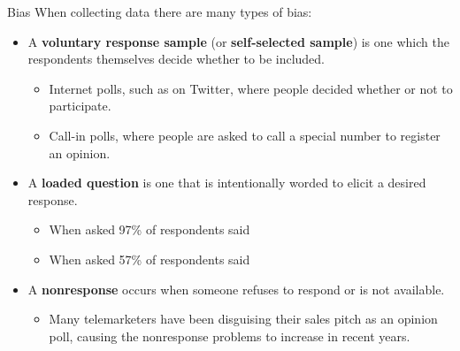 \documentclass{beamer}
\begin{document}
\begin{frame}
\begin{block}{Bias}
When collecting data there are many types of bias:
\begin{itemize}
\item A \textbf{voluntary response sample} (or \textbf{self-selected sample}) is one which the respondents themselves decide whether to be included.\pause
\begin{itemize}
\item Internet polls, such as on Twitter, where people decided whether or not to participate.
\item Call-in polls, where people are asked to call a special number to register an opinion.
\end{itemize}\pause
\item A \textbf{loaded question} is one that is intentionally worded to elicit a desired response.\pause
\begin{itemize}
\item When asked  97\% of respondents said 
\item When asked  57\% of respondents said 
\end{itemize}\pause
\item A \textbf{nonresponse} occurs when someone refuses to respond or is not available.\pause
\begin{itemize}
\item Many telemarketers have been disguising their sales pitch as an opinion poll, causing the nonresponse problems to increase in recent years.
\end{itemize}
\end{itemize}
\end{block}
\end{frame}
\end{document}
